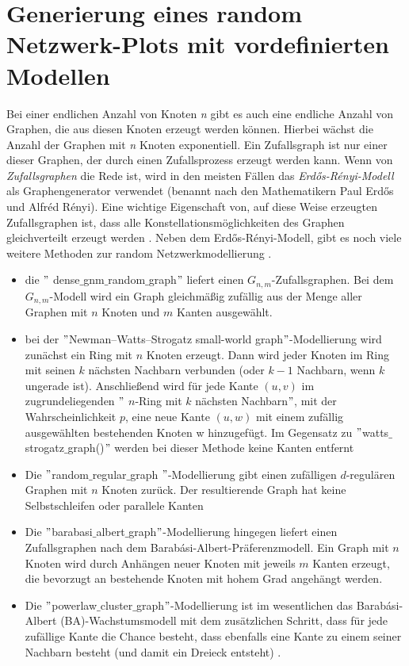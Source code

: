 \section{Generierung eines random Netzwerk-Plots mit vordefinierten Modellen} 
Bei einer endlichen Anzahl von Knoten \textit{n} gibt es auch eine endliche Anzahl von Graphen, die aus diesen Knoten erzeugt werden können. Hierbei wächst die Anzahl der Graphen mit \textit{n} Knoten exponentiell.
Ein Zufallsgraph ist nur einer dieser Graphen, der durch einen Zufallsprozess erzeugt werden kann.
Wenn von \textit{Zufallsgraphen} die Rede ist, wird in den meisten Fällen das \textit{Erdős-Rényi-Modell} als Graphengenerator verwendet (benannt nach den Mathematikern Paul Erdős und Alfréd Rényi). Eine wichtige Eigenschaft von, auf diese Weise erzeugten Zufallsgraphen ist, dass alle Konstellationsmöglichkeiten des Graphen gleichverteilt erzeugt werden \cite{Generators}.
Neben dem Erdős-Rényi-Modell, gibt es noch viele weitere Methoden zur random Netzwerkmodellierung \cite{Generators}.
\begin{itemize}
    \item die $"$ dense$\_$gnm$\_$random$\_$graph$"$ liefert einen $G_{n,m}$-Zufallsgraphen.
    Bei dem $G_{n,m}$-Modell wird ein Graph gleichmäßig zufällig aus der Menge aller Graphen mit $n$ Knoten und $m$ Kanten ausgewählt.
    \item bei der $"$Newman–Watts–Strogatz small-world graph$"$-Modellierung wird zunächst ein Ring mit $n$ Knoten erzeugt. Dann wird jeder Knoten im Ring mit seinen $k$ nächsten Nachbarn verbunden (oder $k - 1$ Nachbarn, wenn $k$ ungerade ist). Anschließend wird für jede Kante $(u, v)$ im zugrundeliegenden $"$ $n$-Ring mit $k$ nächsten Nachbarn$"$, mit der Wahrscheinlichkeit $p$, eine neue Kante $(u, w)$ mit einem zufällig ausgewählten bestehenden Knoten w hinzugefügt. Im Gegensatz zu $"$watts$\_$strogatz$\_$graph()$"$ werden bei dieser Methode keine Kanten entfernt
    \item Die $"$random$\_$regular$\_$graph $"$-Modellierung gibt einen zufälligen $d$-regulären Graphen mit $n$ Knoten zurück.
    Der resultierende Graph hat keine Selbstschleifen oder parallele Kanten
    \item Die $"$barabasi$\_$albert$\_$graph$"$-Modellierung hingegen liefert einen Zufallsgraphen nach dem Barabási-Albert-Präferenzmodell.
    Ein Graph mit $n$ Knoten wird durch Anhängen neuer Knoten mit jeweils $m$ Kanten erzeugt, die bevorzugt an bestehende Knoten mit hohem Grad angehängt werden.
    \item Die $"$powerlaw$\_$cluster$\_$graph$"$-Modellierung ist im wesentlichen das Barabási-Albert (BA)-Wachstumsmodell mit dem zusätzlichen Schritt, dass für jede zufällige Kante die Chance besteht, dass ebenfalls eine Kante zu einem seiner Nachbarn besteht (und damit ein Dreieck entsteht) \cite{Generators}.
\end{itemize}

